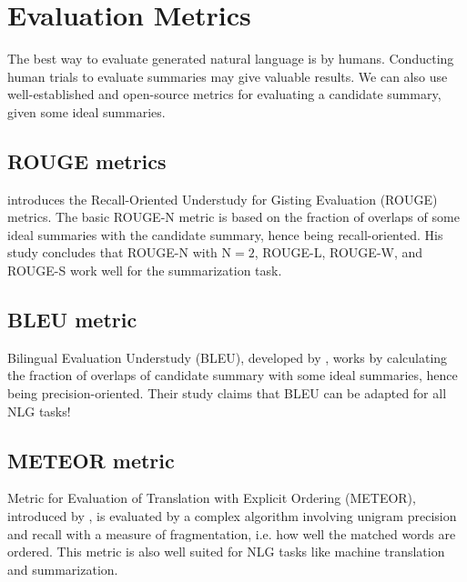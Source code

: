 \section{Evaluation Metrics}

The best way to evaluate generated natural language is by humans.
Conducting human trials to evaluate summaries may give valuable results.
We can also use well-established and open-source metrics for evaluating a candidate
summary, given some ideal summaries.


\subsection{ROUGE metrics}

\citet{lin-2004-rouge} introduces the Recall-Oriented Understudy for Gisting
Evaluation (ROUGE) metrics.
The basic ROUGE-N metric is based on the fraction of overlaps of some ideal summaries
with the candidate summary, hence being recall-oriented.
His study concludes that ROUGE-N with $\text{N}=2$, ROUGE-L, ROUGE-W, and ROUGE-S work
well for the summarization task.

\subsection{BLEU metric}

Bilingual Evaluation Understudy (BLEU), developed by \citet{papineni-etal-2002-bleu},
works by calculating the fraction of overlaps of candidate summary with some ideal
summaries, hence being precision-oriented.
Their study claims that BLEU can be adapted for all NLG tasks!


\subsection{METEOR metric}

Metric for Evaluation of Translation with Explicit Ordering (METEOR), introduced by
\citet{banerjee-lavie-2005-meteor}, is evaluated by a complex algorithm involving
unigram precision and recall with a measure of fragmentation, i.e. how well the matched
words are ordered.
This metric is also well suited for NLG tasks like machine translation and
summarization.
